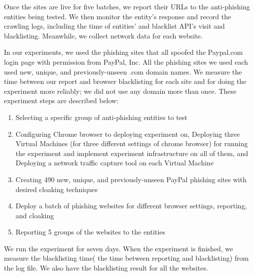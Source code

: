 Once the sites are live for five batches, we report their URLs to the anti-phishing entities being tested. We then monitor the entity's response and record the crawling logs, including the time of entities' and blacklist API's visit and blacklisting. Meanwhile, we collect network data for each website.

In our experiments, we used the phishing sites that all spoofed the Paypal.com login page with permission from PayPal, Inc. All the phishing sites we used each used new, unique, and previously-unseen .com domain names. We measure the time between our report and browser blacklisting for each site and for doing the experiment more reliably; we did not use any domain more than once.  
These experiment steps are described below:  

\begin{enumerate}
    \item Selecting a specific group of anti-phishing entities to test
    \item Configuring Chrome browser to deploying experiment on, Deploying three Virtual Machines (for three different settings of chrome browser) for running the experiment and implement experiment infrastructure on all of them, and Deploying a network traffic capture tool on each Virtual Machine
    \item Creating 490 new, unique, and previously-unseen PayPal phishing sites with desired cloaking techniques
    \item Deploy a batch of phishing websites for different browser settings, reporting, and cloaking
    \item Reporting 5 groups of the websites to the entities
    
\end{enumerate}

We run the experiment for seven days. When the experiment is finished, we measure the blacklisting time( the time between reporting and blacklisting) from the log file. We also have the blacklisting result for all the websites.


